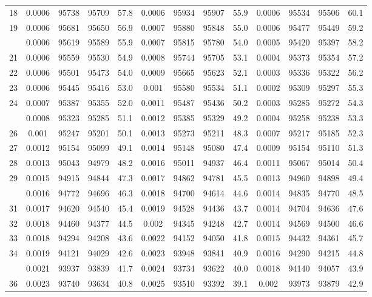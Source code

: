 \documentclass[
  14pt,
]{article}
\begin{document}
\begin{longtable}[t]{lcccccccccccc}
18 & 0.0006 & 95738 & 95709 & 57.8 & 0.0006 & 95934 & 95907 & 55.9 & 0.0006 & 95534 & 95506 & 60.1\\
19 & 0.0006 & 95681 & 95650 & 56.9 & 0.0007 & 95880 & 95848 & 55.0 & 0.0006 & 95477 & 95449 & 59.2\\
\addlinespace
20 & 0.0006 & 95619 & 95589 & 55.9 & 0.0007 & 95815 & 95780 & 54.0 & 0.0005 & 95420 & 95397 & 58.2\\
21 & 0.0006 & 95559 & 95530 & 54.9 & 0.0008 & 95744 & 95705 & 53.1 & 0.0004 & 95373 & 95354 & 57.2\\
22 & 0.0006 & 95501 & 95473 & 54.0 & 0.0009 & 95665 & 95623 & 52.1 & 0.0003 & 95336 & 95322 & 56.2\\
23 & 0.0006 & 95445 & 95416 & 53.0 & 0.001 & 95580 & 95534 & 51.1 & 0.0002 & 95309 & 95297 & 55.3\\
24 & 0.0007 & 95387 & 95355 & 52.0 & 0.0011 & 95487 & 95436 & 50.2 & 0.0003 & 95285 & 95272 & 54.3\\
\addlinespace
25 & 0.0008 & 95323 & 95285 & 51.1 & 0.0012 & 95385 & 95329 & 49.2 & 0.0004 & 95258 & 95238 & 53.3\\
26 & 0.001 & 95247 & 95201 & 50.1 & 0.0013 & 95273 & 95211 & 48.3 & 0.0007 & 95217 & 95185 & 52.3\\
27 & 0.0012 & 95154 & 95099 & 49.1 & 0.0014 & 95148 & 95080 & 47.4 & 0.0009 & 95154 & 95110 & 51.3\\
28 & 0.0013 & 95043 & 94979 & 48.2 & 0.0016 & 95011 & 94937 & 46.4 & 0.0011 & 95067 & 95014 & 50.4\\
29 & 0.0015 & 94915 & 94844 & 47.3 & 0.0017 & 94862 & 94781 & 45.5 & 0.0013 & 94960 & 94898 & 49.4\\
\addlinespace
30 & 0.0016 & 94772 & 94696 & 46.3 & 0.0018 & 94700 & 94614 & 44.6 & 0.0014 & 94835 & 94770 & 48.5\\
31 & 0.0017 & 94620 & 94540 & 45.4 & 0.0019 & 94528 & 94436 & 43.7 & 0.0014 & 94704 & 94636 & 47.6\\
32 & 0.0018 & 94460 & 94377 & 44.5 & 0.002 & 94345 & 94248 & 42.7 & 0.0014 & 94569 & 94500 & 46.6\\
33 & 0.0018 & 94294 & 94208 & 43.6 & 0.0022 & 94152 & 94050 & 41.8 & 0.0015 & 94432 & 94361 & 45.7\\
34 & 0.0019 & 94121 & 94029 & 42.6 & 0.0023 & 93948 & 93841 & 40.9 & 0.0016 & 94290 & 94215 & 44.8\\
\addlinespace
35 & 0.0021 & 93937 & 93839 & 41.7 & 0.0024 & 93734 & 93622 & 40.0 & 0.0018 & 94140 & 94057 & 43.9\\
36 & 0.0023 & 93740 & 93634 & 40.8 & 0.0025 & 93510 & 93392 & 39.1 & 0.002 & 93973 & 93879 & 42.9\\

\end{longtable}
\end{document}
